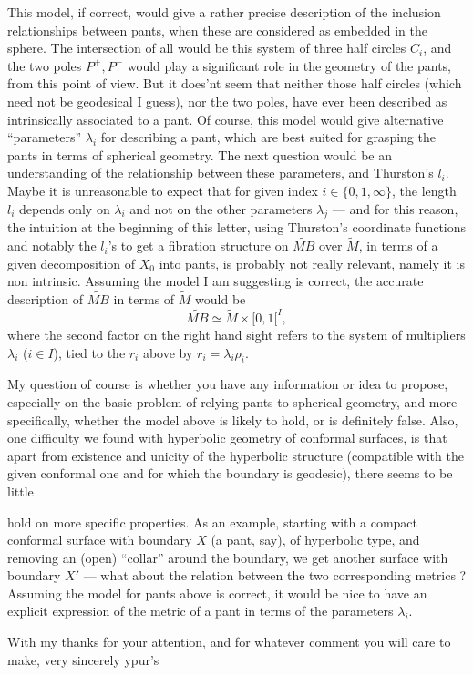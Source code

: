 \documentclass[11pt,a4paper]{article}
\begin{document}
This model, if correct, would give a rather precise description of the
inclusion relationships between pants, when these are considered as embedded
in the sphere. The intersection of all would be this system of three half
circles $C_{i}$, and the two poles $P^{+}, P^{-}$ would play a significant
role in the geometry of the pants, from this point of view. But it does'nt
seem that neither those half circles (which need not be geodesical I guess),
nor the two poles, have ever been described as intrinsically associated to a
pant. Of course, this model would give alternative “parameters” $\lambda_{i}$
for describing a pant, which are best suited for grasping the pants in terms
of spherical geometry. The next question would be an understanding of the
relationship between these parameters, and Thurston's $l_{i}$. Maybe it is
unreasonable to expect that for given index $i \in \{0, 1, \infty\}$, the
length $l_{i}$ depends only on $\lambda_{i}$ and not on the other parameters
$\lambda_{j}$ — and for this reason, \struck{\ill{}} the intuition at the
beginning of this letter, using Thurston's coordinate functions and notably
the $l_{i}$'s to get a fibration structure on $\widetilde{MB}$ over
$\widetilde{M}$, in terms of a given decomposition of $X_{0}$ into pants, is
probably not really relevant, namely it is non intrinsic. Assuming the model
I am suggesting is correct, the accurate description \struck{\ill{}} of
$\widetilde{MB}$ in terms of $\widetilde{M}$ would be
\[
  \widetilde{MB} \simeq \widetilde{M} \times [0, 1[^{I} ,
\]
where the second factor on the right hand sight refers to the system of
multipliers $\lambda_{i}$ ($i \in I$), tied to the $r_{i}$ above by
$r_{i} = \lambda_{i} \rho_{i}$.

My question of course is whether you have any information or idea to
propose, especially on the basic problem of relying pants to spherical
geometry, and more specifically, whether the model above is likely to hold,
or is definitely false. Also, one difficulty we found with hyperbolic
geometry of conformal surfaces, is that apart from existence and unicity of
the hyperbolic structure (compatible with the given conformal one and for
which the boundary is geodesic), there seems to be little

hold on more specific properties. As an example, starting with a compact
conformal surface with boundary $X$ (a pant, say), of hyperbolic type, and
removing an (open) “collar” around the boundary, we get another surface with
boundary $X'$ — what about the relation  between the two
corresponding metrics ? Assuming the model for pants above is correct, it
would be nice to have an explicit expression of the metric of a pant in terms
of the parameters $\lambda_{i}$.

With my thanks for your attention, and for whatever comment you will care to
make, very sincerely ypur's
\end{document}
